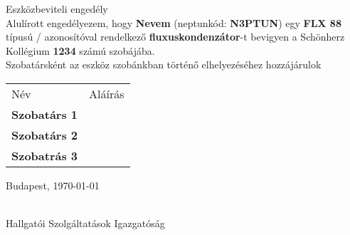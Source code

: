 

\providecommand \mynamea {Nevem}
\providecommand \mynameb {Szobatárs 1}
\providecommand \mynamec {Szobatárs 2}
\providecommand \mynamed {Szobatrás 3}
\providecommand \myneptuna {N3PTUN}
\providecommand \mytype {FLX 88}
\providecommand \mywhat {fluxuskondenzátor}
\providecommand \myroom {1234}

\usepackage[margin=1.5cm,a4paper]{geometry}
\usepackage[magyar]{babel}
\usepackage[none]{hyphenat}

\setlength{\parindent}{0cm}

\pagestyle{empty}


\Large

\hfil {\Huge Eszközbeviteli engedély} \hfil \\

Alulírott engedélyezem, hogy {\bf \mynamea} (neptunkód: {\bf \myneptuna}) egy
{\bf \mytype} típusú / azonosítóval rendelkező {\bf \mywhat}-t bevigyen a
Schönherz Kollégium {\bf \myroom} számú szobájába. \\

Szobatársként az eszköz szobánkban történő elhelyezéséhez hozzájárulok
\begin{center}
	\def\arraystretch{2.5}
	\begin{tabular}{p{8cm} p{8cm}}
		\hfil Név & \hfil Aláírás \\
		{\bf \mynameb} & \underline{\makebox[8cm]{}} \\
		{\bf \mynamec} & \underline{\makebox[8cm]{}} \\
		{\bf \mynamed} & \underline{\makebox[8cm]{}} \\
	\end{tabular}
\end{center}
\vspace{0.8cm}

Budapest, \today \\[0.8cm]

\hfill \parbox{8cm}{
	\hrulefill \\
	\centering Hallgatói Szolgáltatások Igazgatóság
}



